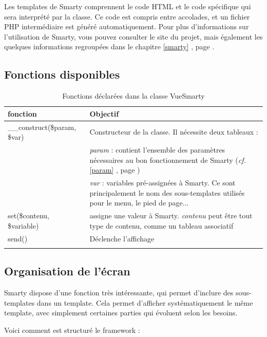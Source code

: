 Les templates de Smarty comprennent le code HTML et le code spécifique qui sera interprété par la classe. Ce code est compris entre accolades, et un fichier PHP intermédiaire est généré automatiquement. Pour plus d'informations sur l'utilisation de Smarty, vous pouvez consulter le site du projet, mais également les quelques informations regroupées dans le chapitre \ref{smarty} \textit{}, page \pageref{smarty}.

\subsection{Fonctions disponibles}
\begin{longtable}{|p{5cm}|p{8cm}|}
\hline
\textbf{fonction} & \textbf{Objectif} \\
\hline
\endhead
\_\_construct(\$param, \$var) & Constructeur de la classe. Il nécessite deux tableaux : \\
 & \textit{param} : contient l'ensemble des paramètres nécessaires au bon fonctionnement de Smarty (\textit{cf.} \ref{param} \textit{\nameref{param}}, page \pageref{param})\\
 & \textit{var} : variables pré-assignées à Smarty. Ce sont principalement le nom des sous-templates utilisés pour le menu, le pied de page...\\

 set(\$contenu, \$variable) & assigne une valeur à Smarty. \textit{contenu} peut être tout type de contenu, comme un tableau associatif \\

 send() & Déclenche l'affichage \\
\hline
\caption{Fonctions déclarées dans la classe VueSmarty}
\end{longtable}


\subsection{Organisation de l'écran}
Smarty dispose d'une fonction très intéressante, qui permet d'inclure des sous-templates dans un template. Cela permet d'afficher systématiquement le même template, avec simplement certaines parties qui évoluent selon les besoins.

Voici comment est structuré le framework :

